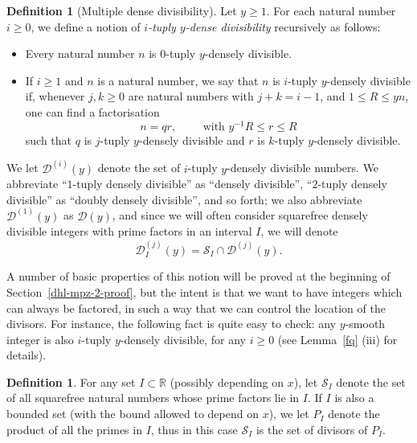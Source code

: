 \documentclass[12pt,a4paper,reqno]{amsart}
\numberwithin{equation}{section}
\theoremstyle{plain}
\theoremstyle{definition}
\newtheorem{definition}[theorem]{Definition}
\newcommand\R{\mathbb{R}}
\newcommand\Scal{\mathcal{S}}
\newcommand\Dcal[2]{\mathcal{D}^{({#1})}({#2})}
\newcommand\Dcone[1]{\mathcal{D}({#1})}
\newcommand{\DI}[3]{\mathcal{D}_{{#1}}^{({#2})}({#3})}
\begin{document}
\begin{definition}[Multiple dense divisibility]\label{mdd-def}  Let $y \geq 1$.  For each natural number $i \geq 0$, we define a notion of \emph{$i$-tuply $y$-dense divisibility} recursively as follows:
\begin{itemize}
\item[(i)] Every natural number $n$ is $0$-tuply $y$-densely divisible.
\item[(ii)] If $i \geq 1$ and $n$ is a natural number, we say that $n$
  is $i$-tuply $y$-densely divisible if, whenever $j,k \geq 0$ are
  natural numbers with $j+k=i-1$, and $1 \leq R \leq yn$, one can find
  a factorisation 
\begin{equation}\label{eq-dd-factor}
  n = qr,\quad\quad\text{ with } y^{-1}R\leq r\leq R
\end{equation}
such that $q$ is $j$-tuply $y$-densely
divisible and $r$ is $k$-tuply $y$-densely divisible.
\end{itemize}
We let $\Dcal{i}{y}$ denote the set of $i$-tuply $y$-densely divisible
numbers.  We abbreviate ``$1$-tuply densely divisible'' as ``densely
divisible'', ``$2$-tuply densely divisible'' as ``doubly densely
divisible'', and so forth; we also abbreviate $\Dcal{1}{y}$ as
$\Dcone{y}$, and since we will often consider squarefree densely
divisible integers with prime factors in an interval $I$, we will
denote
\begin{equation}\label{eq-ddiv-interval}
  \DI{I}{j}{y}=\Scal_I\cap \Dcal{j}{y}.
\end{equation}
\end{definition}

A number of basic properties of this notion will be proved at the beginning of
Section~\ref{dhl-mpz-2-proof}, but the intent is that we want to have
integers which can always be factored, in such a way that we can
control the location of the divisors. For instance, the following fact
is quite easy to check: any $y$-smooth integer is also $i$-tuply
$y$-densely divisible, for any $i\geq 0$ (see Lemma~\ref{fq} (iii) for
details).

\begin{definition}\label{sfi} For any set $I \subset \R$ (possibly depending on $x$), let $\Scal_I$ denote the set
  of all squarefree natural numbers whose prime factors lie in $I$.  If $I$ is also a bounded set (with the bound allowed to depend on $x$),
 we let $P_I$ denote the
  product of all the primes in $I$, thus in this case $\Scal_I$ is the set of divisors of $P_I$.
\end{definition}
\end{document}
